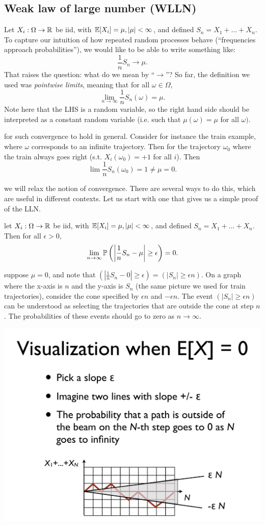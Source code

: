 \documentclass{article}
\begin{document}
\subsection{Weak law of large number (WLLN)}

Let $X_i : \Omega \to \R$ be iid, with $\E[X_i] = \mu, |\mu| < \infty$, and defined $S_n = X_1 + \dots + X_n$. To capture our intuition of how repeated random processes behave (``frequencies approach probabilities''), we would like to be able to write something like: \[ \frac{1}{n} S_n \to \mu. \]That raises the question: what do we mean by ``$\to$''? So far, the definition we used was \emph{pointwise limits}, meaning that for all $\omega\in\Omega$, \[ \lim_{n\to\infty} \frac{1}{n} S_n(\omega) = \mu.\]Note here that the LHS is a random variable, so the right hand side should be interpreted as a constant random variable (i.e. such that $\mu(\omega) = \mu$ for all $\omega)$. 

 for such convergence to hold in general. Consider for instance the train example, where $\omega$ corresponds to an infinite trajectory. Then for the trajectory $\omega_0$ where the train always goes right (s.t. $X_i(\omega_0) = +1$ for all $i$). Then \[ \lim \frac{1}{n} S_n(\omega_0) = 1 \neq \mu = 0.\]

 we will relax the notion of convergence. There are several ways to do this, which are useful in different contexts. Let us start with one that gives us a simple proof of the LLN.

 let $X_i : \Omega \to \R$ be iid, with $\E[X_i] = \mu, |\mu| < \infty$, and defined $S_n = X_1 + \dots + X_n$. Then for all $\epsilon > 0$, \[ \lim_{n\to\infty} \P\left( \left| \frac{1}{n} S_n - \mu\right| \ge \epsilon \right) = 0. \]

 suppose $\mu = 0$, and note that $\left( \left| \frac{1}{n} S_n -0\right| \ge \epsilon \right) = ( |S_n| \ge \epsilon n)$. On a graph where the x-axis is $n$ and the y-axis is $S_n$ (the same picture we used for train trajectories), consider the cone specified by $\epsilon n$ and $-\epsilon n$. The event $( |S_n| \ge \epsilon n)$ can be understood as selecting the trajectories that are outside the cone at step $n$. The probabilities of these events should go to zero as $n\to\infty$.
\begin{center}
\includegraphics[width=0.7\linewidth]{figures/LLN}
\end{center}
\end{document}
